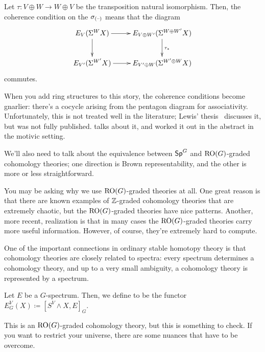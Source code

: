 Let $\tau\colon V\oplus W\to W\oplus V$ be the transposition natural isomorphism. Then, the coherence condition on
the $\sigma_{(\text{--})}$ means that the diagram
\[\xymatrix{
	E_V(\Sigma^W X)\ar[r]\ar[d] & E_{V\oplus W'}(\Sigma^{W\oplus W'}X)\ar[d]^{\tau_*}\\
	E_{V'}(\Sigma^{W'}X)\ar[r] & E_{V'\oplus W}(\Sigma^{W'\oplus W}X)
}\]
commutes.
\begin{rem}
When you add ring structures to this story, the coherence conditions become gnarlier: there's a cocycle arising
from the pentagon diagram for associativity. Unfortunately, this is not treated well in the
literature; Lewis' thesis~\cite{LewisThesis} discusses it, but was not fully published. \cite[Appendix
A]{LewisMandell} talks about it, and  worked it out in the abstract in the motivic setting.
\end{rem}
We'll also need to talk about the equivalence between $\mathsf{Sp}^G$ and $\mathrm{RO}(G)$-graded cohomology theories; one
direction is Brown representability, and the other is more or less straightforward.

You may be asking why we use $\mathrm{RO}(G)$-graded theories at all. One great reason is that there are known examples of
$\mathbb Z$-graded cohomology theories that are extremely chaotic, but the $\mathrm{RO}(G)$-graded theories have nice patterns.
Another, more recent, realization is that in many cases the $\mathrm{RO}(G)$-graded theories carry more useful information.
However, of course, they're extremely hard to compute.

%
One of the important connections in ordinary stable homotopy theory is that cohomology theories are closely related
to spectra: every spectrum determines a cohomology theory, and up to a very small ambiguity, a cohomology theory is
represented by a spectrum.
\begin{defn}
Let $E$ be a $G$-spectrum. Then, we define
to be the functor $E_G^V(X)\coloneqq [S^V\wedge X, E]_G$.
\end{defn}
This is an $\mathrm{RO}(G)$-graded cohomology theory, but this is something to check. If you want to restrict your
universe, there are some nuances that have to be overcome.


